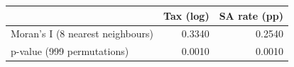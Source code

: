 \begin{tabular}{lrr}
\toprule
 & Tax (log) & SA rate (pp) \\
\midrule
Moran's I (8 nearest neighbours) & 0.3340 & 0.2540 \\
p-value (999 permutations) & 0.0010 & 0.0010 \\
\bottomrule
\end{tabular}
